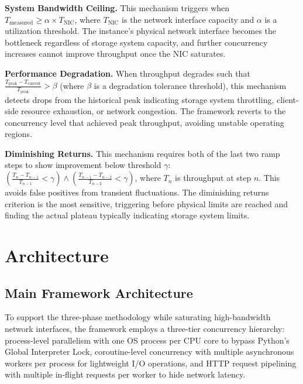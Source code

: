 \textbf{System Bandwidth Ceiling.} This mechanism triggers when $T_{\text{measured}} \geq \alpha \times T_{\text{NIC}}$, where $T_{\text{NIC}}$ is the network interface capacity and $\alpha$ is a utilization threshold. The instance's physical network interface becomes the bottleneck regardless of storage system capacity, and further concurrency increases cannot improve throughput once the NIC saturates.

\textbf{Performance Degradation.} When throughput degrades such that $\frac{T_{\text{peak}} - T_{\text{current}}}{T_{\text{peak}}} > \beta$ (where $\beta$ is a degradation tolerance threshold), this mechanism detects drops from the historical peak indicating storage system throttling, client-side resource exhaustion, or network congestion. The framework reverts to the concurrency level that achieved peak throughput, avoiding unstable operating regions.

\textbf{Diminishing Returns.} This mechanism requires both of the last two ramp steps to show improvement below threshold $\gamma$: $\left( \frac{T_n - T_{n-1}}{T_{n-1}} < \gamma \right) \land \left( \frac{T_{n-1} - T_{n-2}}{T_{n-2}} < \gamma \right)$, where $T_n$ is throughput at step $n$. This avoids false positives from transient fluctuations. The diminishing returns criterion is the most sensitive, triggering before physical limits are reached and finding the actual plateau typically indicating storage system limits.

\section{Architecture}\label{sec:architecture}

\subsection{Main Framework Architecture}\label{sec:main-architecture}

To support the three-phase methodology while saturating high-bandwidth network interfaces, the framework employs a three-tier concurrency hierarchy: process-level parallelism with one OS process per CPU core to bypass Python's Global Interpreter Lock, coroutine-level concurrency with multiple asynchronous workers per process for lightweight I/O operations, and HTTP request pipelining with multiple in-flight requests per worker to hide network latency.

